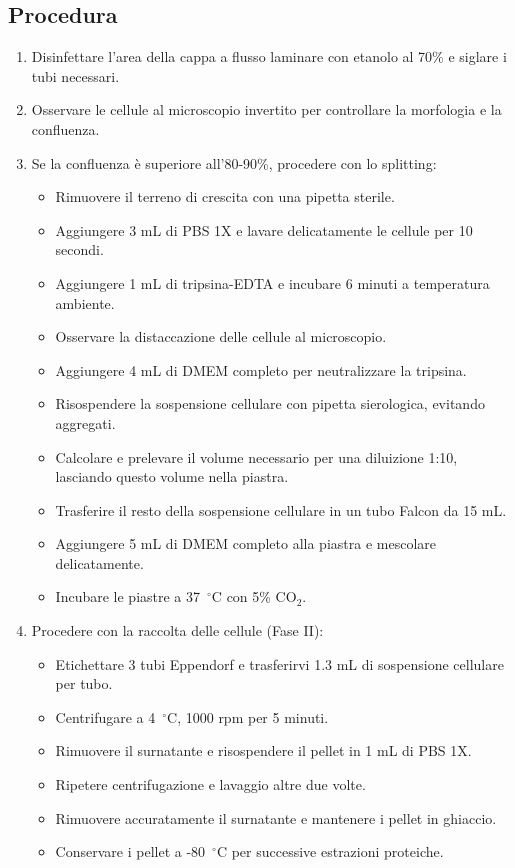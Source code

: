 \subsection{Procedura}
\begin{enumerate}\footnotesize
  \item Disinfettare l’area della cappa a flusso laminare con etanolo al 70\% e siglare i tubi necessari.
  \item Osservare le cellule al microscopio invertito per controllare la morfologia e la confluenza.
  \item Se la confluenza è superiore all’80-90\%, procedere con lo splitting:
  \begin{itemize}
    \item Rimuovere il terreno di crescita con una pipetta sterile.
    \item Aggiungere 3 mL di PBS 1X e lavare delicatamente le cellule per 10 secondi.
    \item Aggiungere 1 mL di tripsina-EDTA e incubare 6 minuti a temperatura ambiente.
    \item Osservare la distaccazione delle cellule al microscopio.
    \item Aggiungere 4 mL di DMEM completo per neutralizzare la tripsina.
    \item Risospendere la sospensione cellulare con pipetta sierologica, evitando aggregati.
    \item Calcolare e prelevare il volume necessario per una diluizione 1:10, lasciando questo volume nella piastra.
    \item Trasferire il resto della sospensione cellulare in un tubo Falcon da 15 mL.
    \item Aggiungere 5 mL di DMEM completo alla piastra e mescolare delicatamente.
    \item Incubare le piastre a 37~$^\circ$C con 5\% CO$_2$.
  \end{itemize}
  \item Procedere con la raccolta delle cellule (Fase II):
  \begin{itemize}
    \item Etichettare 3 tubi Eppendorf e trasferirvi 1.3 mL di sospensione cellulare per tubo.
    \item Centrifugare a 4~$^\circ$C, 1000 rpm per 5 minuti.
    \item Rimuovere il surnatante e risospendere il pellet in 1 mL di PBS 1X.
    \item Ripetere centrifugazione e lavaggio altre due volte.
    \item Rimuovere accuratamente il surnatante e mantenere i pellet in ghiaccio.
    \item Conservare i pellet a -80~$^\circ$C per successive estrazioni proteiche.
  \end{itemize}
\end{enumerate}

